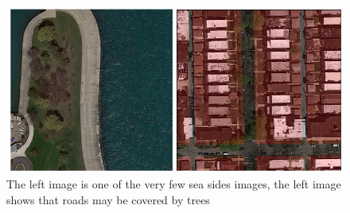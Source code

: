 \documentclass[10pt,conference,compsocconf]{IEEEtran}
\begin{document}
\begin{figure}[h]
	\centering
	\includegraphics[width=\columnwidth]{img/corner_cases1.png}
	\vspace{-3mm}
	\caption{The left image is one of the very few sea sides images, the left image shows that roads may be covered by trees}
	\label{fig:corner-cases}
\end{figure}
\end{document}
